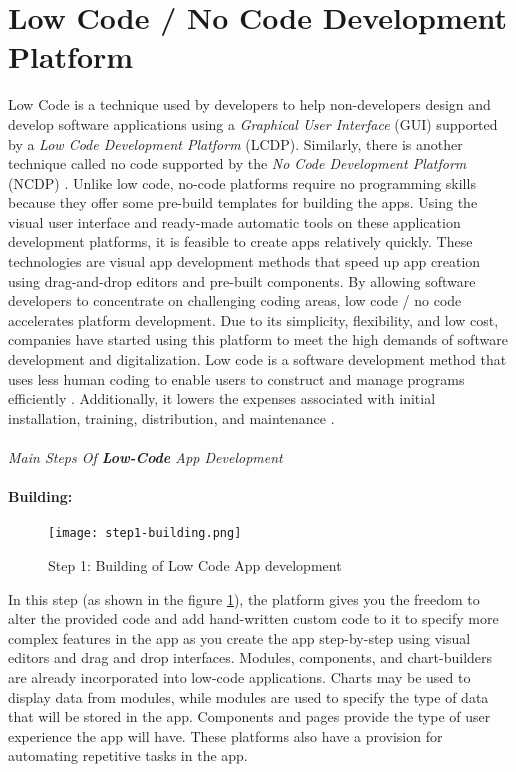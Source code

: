 \section{Low Code / No Code Development Platform}
\label{background:section:lowcode}
Low Code is a technique used by developers to help non-developers design and develop software applications using a \textit{Graphical User Interface} (GUI) supported by a \textit{Low Code Development Platform} (LCDP).
Similarly, there is another technique called no code supported by the \textit{No Code Development Platform} (NCDP) \cite{article:nocode:miller}.
Unlike low code, no-code platforms require no programming skills because they offer some pre-build templates for building the apps.
Using the visual user interface and ready-made automatic tools on these application development platforms, it is feasible to create apps relatively quickly. 
These technologies are visual app development methods that speed up app creation using drag-and-drop editors and pre-built components. 
By allowing software developers to concentrate on challenging coding areas, low code / no code accelerates platform development.
Due to its simplicity, flexibility, and low cost, companies have started using this platform to meet the high demands of software development and digitalization.
Low code is a software development method that uses less human coding to enable users to construct and manage programs efficiently \cite{article:nocode:sahina}.
Additionally, it lowers the expenses associated with initial installation, training, distribution, and maintenance \cite{article:nocode:sanchi}.\\ \\
\textit{Main Steps Of \textbf{Low-Code} App Development}
\paragraph*{Building:}
\begin{figure}[htbp!]
  \centering    
  \texttt{[image: step1-building.png]}
  \caption[Building]{Step 1: Building of Low Code App development}
  \label{fig:background:building}
\end{figure}
In this step (as shown in the figure \ref{fig:background:building}), the platform gives you the freedom to alter the provided code and add hand-written custom code to it to specify more complex features in the app as you create the app step-by-step using visual editors and drag and drop interfaces.
Modules, components, and chart-builders are already incorporated into low-code applications. 
Charts may be used to display data from modules, while modules are used to specify the type of data that will be stored in the app. 
Components and pages provide the type of user experience the app will have.
These platforms also have a provision for automating repetitive tasks in the app.
